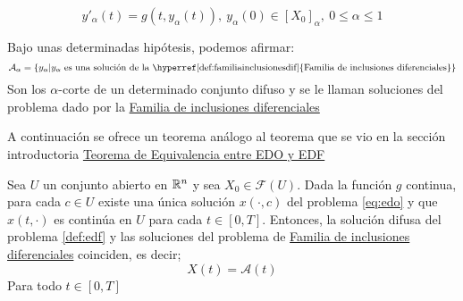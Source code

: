 \begin{equation}
	\label{def:familiainclusionesdif}
	y'_\alpha(t) = g(t, y_\alpha(t)), ~ y_\alpha(0) \in [X_0]_\alpha, ~ 0 \leq \alpha \leq 1
\end{equation}

Bajo unas determinadas hipótesis, podemos afirmar:
\[
	\mathcal{A}_\alpha = \{y_\alpha | y_\alpha ~ \text{es una solución de la \hyperref[def:familiainclusionesdif]{Familia de inclusiones diferenciales}}\}
\]
Son los $\alpha$-corte de un determinado conjunto difuso y se le llaman soluciones del problema dado por la \hyperref[def:familiainclusionesdif]{Familia de inclusiones diferenciales}

A continuación se ofrece un teorema análogo al teorema que se vio en la sección introductoria \hyperref[teorema:equivalencia]{Teorema de Equivalencia entre EDO y EDF}
\begin{teorema}
	Sea $U$ un conjunto abierto en $\mathbb R^n$ y sea $X_0 \in \mathcal{F}(U)$. Dada la función $g$ continua, para cada $c \in U$ existe una única solución $x(\cdot, c)$ del problema \ref{eq:edo} y que $x(t, \cdot)$ es continúa en $U$ para cada $t \in [0, T]$. Entonces, la solución difusa del problema \ref{def:edf} y las soluciones del problema de \hyperref[def:familiainclusionesdif]{Familia de inclusiones diferenciales} coinciden, es decir;
	\[
		X(t) = \mathcal{A}(t)
	\]
	Para todo $t \in [0, T]$
\end{teorema}
